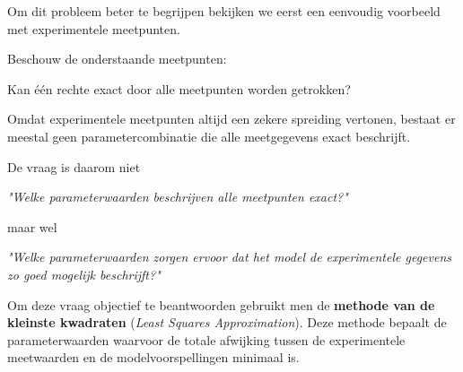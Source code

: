 \documentclass{ximera}
\begin{document}
\begin{question} \text{ }

Om dit probleem beter te begrijpen bekijken we eerst een eenvoudig voorbeeld met experimentele meetpunten.

Beschouw de onderstaande meetpunten:
\begin{center}
\end{center}

Kan één rechte exact door alle meetpunten worden getrokken?

\begin{multipleChoice}
\end{multipleChoice}

\end{question}

\begin{conclusion} \text{ }

Omdat experimentele meetpunten altijd een zekere spreiding vertonen, bestaat er meestal geen parametercombinatie die alle meetgegevens exact beschrijft.

De vraag is daarom niet
\begin{center}
\emph{"Welke parameterwaarden beschrijven alle meetpunten exact?"}
\end{center}

maar wel

\begin{center}
\emph{"Welke parameterwaarden zorgen ervoor dat het model de experimentele gegevens zo goed mogelijk beschrijft?"}
\end{center}

Om deze vraag objectief te beantwoorden gebruikt men de \textbf{methode van de kleinste kwadraten} (\textit{Least Squares Approximation}). Deze methode bepaalt de parameterwaarden waarvoor de totale afwijking tussen de experimentele meetwaarden en de modelvoorspellingen minimaal is.
\end{conclusion}
\end{document}
